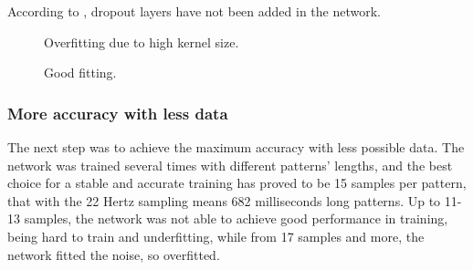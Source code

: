 According to \cite{Hin12}, dropout layers have not been added in the network.

\begin{center}
	\begin{figure}[ht]
		\caption{Overfitting due to high kernel size.}
	\end{figure}
\end{center}

\begin{center}
	\begin{figure}[ht]
		\caption{Good fitting.}
	\end{figure}
\end{center}

\subsubsection{More accuracy with less data}
The next step was to achieve the maximum accuracy with less possible data. The network was trained several times with different patterns' lengths, and the best choice for a stable and accurate training has proved to be 15 samples per pattern, that with the 22 Hertz sampling means 682 milliseconds long patterns. Up to 11-13 samples, the network was not able to achieve good performance in training, being hard to train and underfitting, while from 17 samples and more, the network fitted the noise, so overfitted.

